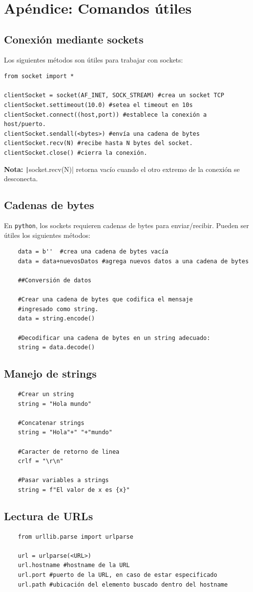 \documentclass[a4paper,10pt]{article}
\begin{document}
\section*{Apéndice: Comandos útiles}

\subsection*{Conexión mediante sockets}

Los siguientes métodos son útiles para trabajar con sockets:
\begin{verbatim}
from socket import *

clientSocket = socket(AF_INET, SOCK_STREAM) #crea un socket TCP
clientSocket.settimeout(10.0) #setea el timeout en 10s
clientSocket.connect((host,port)) #establece la conexión a host/puerto.
clientSocket.sendall(<bytes>) #envía una cadena de bytes
clientSocket.recv(N) #recibe hasta N bytes del socket.
clientSocket.close() #cierra la conexión.
\end{verbatim}

\textbf{Nota:} \texttt|socket.recv(N)| retorna vacío cuando el otro extremo de la conexión se desconecta.
\subsection*{Cadenas de bytes}

En \texttt{python}, los sockets requieren cadenas de bytes para enviar/recibir. Pueden ser útiles los siguientes métodos:

\begin{verbatim}
    data = b''  #crea una cadena de bytes vacía
    data = data+nuevosDatos #agrega nuevos datos a una cadena de bytes

    ##Conversión de datos

    #Crear una cadena de bytes que codifica el mensaje 
    #ingresado como string.
    data = string.encode() 

    #Decodificar una cadena de bytes en un string adecuado:
    string = data.decode()
\end{verbatim}

\subsection*{Manejo de strings}

\begin{verbatim}
    #Crear un string
    string = "Hola mundo"
    
    #Concatenar strings
    string = "Hola"+" "+"mundo"

    #Caracter de retorno de linea
    crlf = "\r\n"

    #Pasar variables a strings
    string = f"El valor de x es {x}"
\end{verbatim}


\subsection*{Lectura de URLs}

\begin{verbatim}
    from urllib.parse import urlparse

    url = urlparse(<URL>)
    url.hostname #hostname de la URL
    url.port #puerto de la URL, en caso de estar especificado
    url.path #ubicación del elemento buscado dentro del hostname
\end{verbatim}
\end{document}
